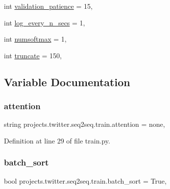 \begin{DoxyCompactItemize}
\item 
int \hyperlink{namespaceprojects_1_1twitter_1_1seq2seq_1_1train_a46a5926d32d06e8253d9cb6ef93f4ee4}{validation\+\_\+patience} = 15,
\item 
int \hyperlink{namespaceprojects_1_1twitter_1_1seq2seq_1_1train_ad688d4a4b09ce4fdabcf0a00b37d3b53}{log\+\_\+every\+\_\+n\+\_\+secs} = 1,
\item 
int \hyperlink{namespaceprojects_1_1twitter_1_1seq2seq_1_1train_ac11cc9682c22a633d93b9598da91b001}{numsoftmax} = 1,
\item 
int \hyperlink{namespaceprojects_1_1twitter_1_1seq2seq_1_1train_a20714d282c7ca89c8cf9997618e3790f}{truncate} = 150,
\end{DoxyCompactItemize}


\subsection{Variable Documentation}
\mbox{\label{namespaceprojects_1_1twitter_1_1seq2seq_1_1train_a75fbf83d263214701993abcbec8ede18}} 
\subsubsection{\texorpdfstring{attention}{attention}}
{\footnotesize\ttfamily string projects.\+twitter.\+seq2seq.\+train.\+attention = \textquotesingle{}none\textquotesingle{},}



Definition at line 29 of file train.\+py.

\mbox{\label{namespaceprojects_1_1twitter_1_1seq2seq_1_1train_a4119f78ff288b9c466b3c2308f42e4c8}} 
\subsubsection{\texorpdfstring{batch\+\_\+sort}{batch\_sort}}
{\footnotesize\ttfamily bool projects.\+twitter.\+seq2seq.\+train.\+batch\+\_\+sort = True,}



